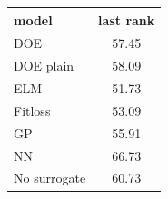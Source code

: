 \begin{tabular}{|lc|}
\hline
model & last rank\\
\hline
DOE & 57.45 \\
DOE plain & 58.09 \\
ELM & 51.73 \\
Fitloss & 53.09 \\
GP & 55.91 \\
NN & 66.73 \\
No surrogate & 60.73 \\
\hline
\end{tabular}
